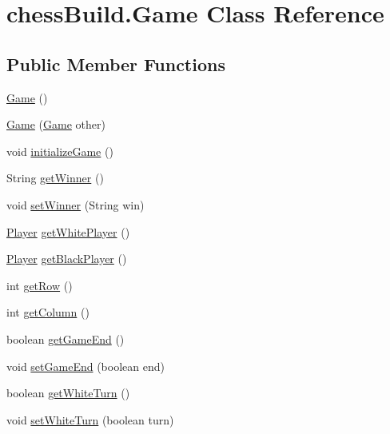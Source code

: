 \hypertarget{classchess_build_1_1_game}{}\section{chess\+Build.\+Game Class Reference}
\label{classchess_build_1_1_game}
\subsection*{Public Member Functions}
\begin{DoxyCompactItemize}
\item 
\hyperlink{classchess_build_1_1_game_aaaf23256b0a8d37893c6671d17e7a163}{Game} ()
\item 
\hyperlink{classchess_build_1_1_game_a0d9475651b9d1824074a45bae670c03a}{Game} (\hyperlink{classchess_build_1_1_game}{Game} other)
\item 
void \hyperlink{classchess_build_1_1_game_a5a575d1b5298b7ddee17f08a1784153b}{initialize\+Game} ()
\item 
String \hyperlink{classchess_build_1_1_game_af10e6d9b2b1192e1381a4ae3cffbca5c}{get\+Winner} ()
\item 
void \hyperlink{classchess_build_1_1_game_a6bc01e50f0e37b437db78cb029807d25}{set\+Winner} (String win)
\item 
\hyperlink{classchess_build_1_1_player}{Player} \hyperlink{classchess_build_1_1_game_aa2ae560bff80ac9628ffee5b4fa57b33}{get\+White\+Player} ()
\item 
\hyperlink{classchess_build_1_1_player}{Player} \hyperlink{classchess_build_1_1_game_a1aa884addf9d116b66cd8643995144a4}{get\+Black\+Player} ()
\item 
int \hyperlink{classchess_build_1_1_game_a6271b0abcddb945758b3a70ec3a2be47}{get\+Row} ()
\item 
int \hyperlink{classchess_build_1_1_game_a6c917e051708604f5385062146e2880c}{get\+Column} ()
\item 
boolean \hyperlink{classchess_build_1_1_game_abf2a3e04a58e0ed986dc5951002b3af6}{get\+Game\+End} ()
\item 
void \hyperlink{classchess_build_1_1_game_ac6400be2899f19c3ee57cc5946ea4154}{set\+Game\+End} (boolean end)
\item 
boolean \hyperlink{classchess_build_1_1_game_a5ef5fc90fd60545c3b70a1eff98ce306}{get\+White\+Turn} ()
\item 
void \hyperlink{classchess_build_1_1_game_a32d1a61488dc1af6c1d33c3ff2f40bd1}{set\+White\+Turn} (boolean turn)
\item 

\end{DoxyCompactItemize}
